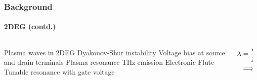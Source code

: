 \documentclass[mathserif,16pt,xcolor=table]{beamer}
\begin{document}
  \begin{frame}
    \frametitle{Background}
    \framesubtitle{2DEG (contd.)}

    \begin{columns} %
      \begin{column}{.5\textwidth}
        \begin{minipage}[T][.1\textheight][c]{\linewidth}
          \begin{outline}[itemize]
            \1 Plasma waves in 2DEG
            \1 Dyakonov-Shur instability
            \2 Voltage bias at source and drain terminals
            \2 Plasma resonance
            \2 THz emission
            \1 Electronic Flute
            \2 Tunable resonance with gate voltage
          \end{outline}
        \end{minipage}
      \end{column}
      \begin{column}{.5\textwidth}
        \begin{figure}
          \hspace*{-.55cm}
          \fontsize{6}{7}\selectfont
          \def\svgwidth{1.1\linewidth}
          
        \end{figure}
        \begin{equation} \nonumber
          \begin{split}
            \lambda &= \frac{c}{f} \\
            & \Longrightarrow  300 \mu \mathrm{m}
          \end{split}
          \label{eq:disp_TE_two}
        \end{equation}
        \end{column}%
      \end{columns}
    \end{frame}
\end{document}
